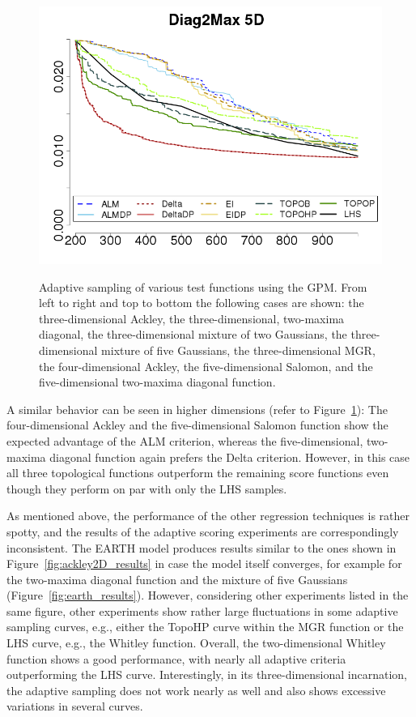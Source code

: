 \begin{figure}[t]
\begin{center}
   \includegraphics[width=0.24\linewidth]{figs/chap5/gpm_Diag2Max_5D_td=200}\label{fig:2diag5D_gpm}
  \caption{Adaptive sampling of various test functions using the GPM. From left to right and top to bottom the following cases are shown: the three-dimensional Ackley,
  the three-dimensional, two-maxima diagonal, the three-dimensional mixture of two Gaussians, the three-dimensional mixture of five Gaussians, the three-dimensional MGR, the four-dimensional Ackley, the five-dimensional Salomon, and the five-dimensional two-maxima diagonal function.}
  \label{fig:345D_gpm}
  \end{center}
\end{figure}

A similar behavior can be seen in higher dimensions (refer to Figure~\ref{fig:345D_gpm}): The four-dimensional Ackley and the five-dimensional Salomon function show the expected advantage of the ALM criterion, whereas the five-dimensional, two-maxima diagonal function again prefers the Delta criterion.
%
However, in this case all three topological functions outperform the remaining score functions even though they perform on par with only the LHS samples.

As mentioned above, the performance of the other regression techniques is rather spotty, and the results of the adaptive scoring experiments are correspondingly inconsistent.
%
The EARTH model produces results similar to the ones shown in Figure~\ref{fig:ackley2D_results} in case the model itself converges, for example for the two-maxima diagonal function and the mixture of five Gaussians (Figure~\ref{fig:earth_results}).
%
However, considering other experiments listed in the same figure, other experiments show rather large fluctuations in some adaptive sampling curves, e.g., either the TopoHP curve within the MGR function or the LHS curve, e.g., the Whitley function.
%
Overall, the two-dimensional Whitley function shows a good performance, with nearly all adaptive criteria outperforming the LHS curve.
%
Interestingly, in its three-dimensional incarnation, the adaptive sampling does not work nearly as well and also shows excessive variations in several curves.

